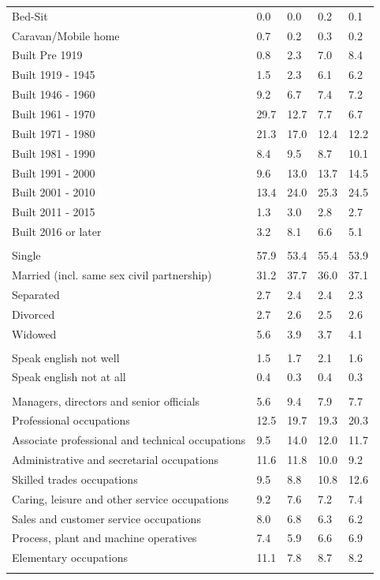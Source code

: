 \documentclass{article}
\begin{document}
\begin{table}[h]
\begin{tabular}{KTTTT}
Bed-Sit & 0.0& 0.0& 0.2& 0.1\\
Caravan/Mobile home & 0.7& 0.2& 0.3& 0.2\\
    \hline
Built Pre 1919 & 0.8& 2.3& 7.0& 8.4\\
Built 1919 - 1945 & 1.5& 2.3& 6.1& 6.2\\
Built  1946 - 1960 & 9.2& 6.7& 7.4& 7.2\\
Built  1961 - 1970 & 29.7& 12.7&  7.7&  6.7\\
Built  1971 - 1980 & 21.3& 17.0& 12.4& 12.2\\
Built  1981 - 1990 &  8.4&  9.5&  8.7& 10.1\\
Built  1991 - 2000 &  9.6& 13.0& 13.7& 14.5\\
Built  2001 - 2010 & 13.4& 24.0& 25.3& 24.5\\
Built  2011 - 2015 & 1.3& 3.0& 2.8& 2.7\\
Built  2016 or later & 3.2& 8.1& 6.6& 5.1\\
\hline
    \\
    \hline
Single & 57.9& 53.4& 55.4& 53.9\\
Married (incl. same sex civil partnership) & 31.2& 37.7& 36.0& 37.1\\
Separated  & 2.7& 2.4& 2.4& 2.3\\
Divorced  & 2.7& 2.6& 2.5& 2.6\\
Widowed & 5.6& 3.9& 3.7& 4.1\\
\hline
    \\ 
    \hline
Speak english not well & 1.5& 1.7& 2.1& 1.6\\
Speak english not at all & 0.4& 0.3& 0.4& 0.3\\
\hline
    \\
    \hline
Managers, directors and senior officials & 5.6& 9.4& 7.9& 7.7\\
Professional occupations & 12.5& 19.7& 19.3& 20.3\\
Associate professional and technical occupations &  9.5& 14.0& 12.0& 11.7\\
Administrative and secretarial occupations & 11.6& 11.8& 10.0&  9.2\\
Skilled trades occupations &  9.5&  8.8& 10.8& 12.6\\
Caring, leisure and other service occupations & 9.2& 7.6& 7.2& 7.4\\
Sales and customer service occupations & 8.0& 6.8& 6.3& 6.2\\
Process, plant and machine operatives & 7.4& 5.9& 6.6& 6.9\\
Elementary occupations & 11.1&  7.8&  8.7&  8.2\\
\hline
\end{tabular}
\end{table}
\end{document}
